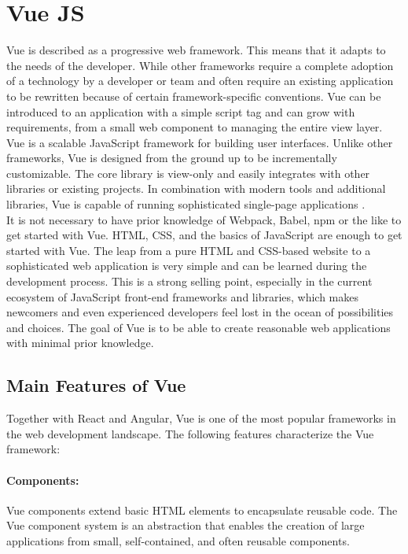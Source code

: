 	\section{Vue JS}
	\label{Grundlagen:Vue}
	Vue is described as a progressive web framework. This means that it adapts to the needs of the developer. While other frameworks require a complete adoption of a technology by a developer or team and often require an existing application to be rewritten because of certain framework-specific conventions. Vue can be introduced to an application with a simple script tag and can grow with requirements, from a small web component to managing the entire view layer. Vue is a scalable JavaScript framework for building user interfaces. Unlike other frameworks, Vue is designed from the ground up to be incrementally customizable. The core library is view-only and easily integrates with other libraries or existing projects. In combination with modern tools and additional libraries, Vue is capable of running sophisticated single-page applications \cite{Vue019:Intro:Online}.\\

	It is not necessary to have prior knowledge of Webpack, Babel, npm or the like to get started with Vue. HTML, CSS, and the basics of JavaScript are enough to get started with Vue.
	The leap from a pure HTML and CSS-based website to a sophisticated web application is very simple and can be learned during the development process. This is a strong selling point, especially in the current ecosystem of JavaScript front-end frameworks and libraries, which makes newcomers and even experienced developers feel lost in the ocean of possibilities and choices. The goal of Vue is to be able to create reasonable web applications with minimal prior knowledge.
	
	\subsection{Main Features of Vue}
	\label{Grundlagen:VueFeatures}
	Together with React and Angular, Vue is one of the most popular frameworks in the web development landscape. The following features characterize the Vue framework:


	
	\paragraph*{Components:} Vue components extend basic \gls{HTML} elements to encapsulate reusable code. The Vue component system is an abstraction that enables the creation of large applications from small, self-contained, and often reusable components.
